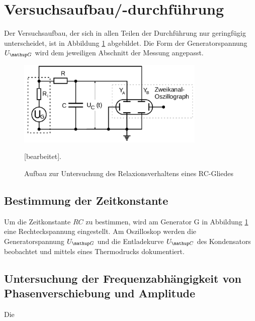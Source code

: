 \section{Versuchsaufbau/-durchführung}
Der Versuchsaufbau, der sich in allen Teilen der Durchführung nur geringfügig unterscheidet, ist in Abbildung \ref{fig:aufbau} abgebildet.
Die Form der Generatorspannung $U\ua{G}$ wird dem jeweiligen Abschnitt der Messung angepasst.
\begin{figure}
  \centering
  \includegraphics[width = 0.8\textwidth]{pics/aufbau.png}
  \caption{Aufbau zur Untersuchung des Relaxionsverhaltens eines RC-Gliedes \cite{anleitung207}}[bearbeitet].
  \label{fig:aufbau}
\end{figure}
\subsection{Bestimmung der Zeitkonstante}
Um die Zeitkonstante $RC$ zu bestimmen, wird am Generator G in Abbildung \ref{fig:aufbau} eine Rechteckspannung eingestellt.
Am Oszilloskop werden die Generatorspannung $U\ua{G}$ und die Entladekurve $U\ua{C}$ des Kondensators beobachtet und mittels eines Thermodrucks
dokumentiert.

\subsection{Untersuchung der Frequenzabhängigkeit von Phasenverschiebung und Amplitude}
Die
